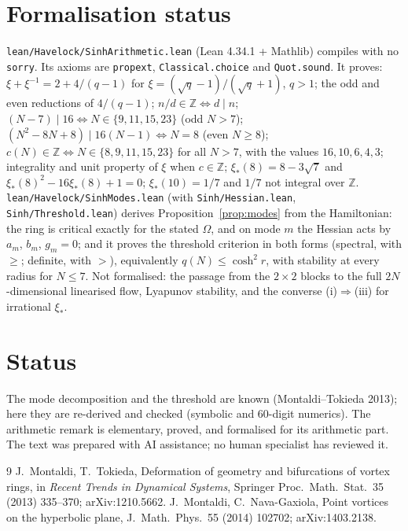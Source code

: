 \documentclass[11pt]{article}
\theoremstyle{remark}
\begin{document}
\section{Formalisation status}
\texttt{lean/Havelock/SinhArithmetic.lean} (Lean 4.34.1 + Mathlib) compiles with no
\texttt{sorry}. Its axioms are \texttt{propext}, \texttt{Classical.choice} and \texttt{Quot.sound}. It
proves:
$\xi+\xi^{-1}=2+4/(q-1)$ for $\xi=(\sqrt q-1)/(\sqrt q+1)$, $q>1$;
the odd and even reductions of $4/(q-1)$;
$n/d\in\mathbb Z\iff d\mid n$;
$(N-7)\mid16\iff N\in\{9,11,15,23\}$ (odd $N>7$);
$(N^2-8N+8)\mid16(N-1)\iff N=8$ (even $N\ge8$);
$c(N)\in\mathbb Z\iff N\in\{8,9,11,15,23\}$ for all $N>7$, with the values $16,10,6,4,3$;
integrality and unit property of $\xi$ when $c\in\mathbb Z$;
$\xi_*(8)=8-3\sqrt7$ and $\xi_*(8)^2-16\xi_*(8)+1=0$;
$\xi_*(10)=1/7$ and $1/7$ not integral over $\mathbb Z$.
\texttt{lean/Havelock/SinhModes.lean} (with \texttt{Sinh/Hessian.lean}, \texttt{Sinh/Threshold.lean}) derives
Proposition~\ref{prop:modes} from the Hamiltonian: the ring is critical exactly for the stated $\Omega$, and on mode $m$
the Hessian acts by $a_m$, $b_m$, $g_m=0$; and it proves the threshold criterion in both forms (spectral, with
$\ge$; definite, with $>$), equivalently $q(N)\le\cosh^2r$, with stability at every radius for $N\le7$.
Not formalised: the passage from the $2\times2$ blocks to the full $2N$-dimensional linearised flow, Lyapunov
stability, and the converse (i)$\Rightarrow$(iii) for irrational $\xi_*$.

\section{Status}
The mode decomposition and the threshold are known (Montaldi--Tokieda 2013); here they are re-derived and checked
(symbolic and 60-digit numerics). The arithmetic remark is elementary, proved, and formalised for its arithmetic part.
The text was prepared with AI assistance; no human specialist has reviewed it.

\begin{thebibliography}{9}
 J.~Montaldi, T.~Tokieda, Deformation of geometry and bifurcations of vortex rings, in
\emph{Recent Trends in Dynamical Systems}, Springer Proc.\ Math.\ Stat.\ 35 (2013) 335--370; arXiv:1210.5662.
 J.~Montaldi, C.~Nava-Gaxiola, Point vortices on the hyperbolic plane, J.\ Math.\ Phys.\ 55
(2014) 102702; arXiv:1403.2138.
\end{thebibliography}
\end{document}
